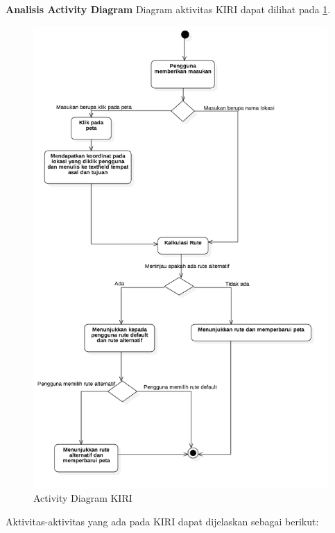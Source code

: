 \documentclass[a4paper,twoside]{article}
\begin{document}
\textbf{Analisis Activity Diagram}
Diagram aktivitas KIRI dapat dilihat pada \ref{fig:3_activitydiagram}.

\begin{figure}[H]
	\centering
	\includegraphics[scale=0.5]{Gambar/activitydiagram}
	\caption{Activity Diagram KIRI} 
	\label{fig:3_activitydiagram}
\end{figure}

Aktivitas-aktivitas yang ada pada KIRI dapat dijelaskan sebagai berikut:
\end{document}

